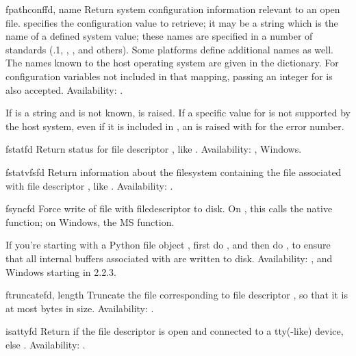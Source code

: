 \begin{funcdesc}{fpathconf}{fd, name}
Return system configuration information relevant to an open file.
 specifies the configuration value to retrieve; it may be a
string which is the name of a defined system value; these names are
specified in a number of standards (\POSIX.1, , , and
others).  Some platforms define additional names as well.  The names
known to the host operating system are given in the
 dictionary.  For configuration variables not
included in that mapping, passing an integer for  is also
accepted.
Availability: \UNIX.

If  is a string and is not known,  is
raised.  If a specific value for  is not supported by the
host system, even if it is included in , an
 is raised with  for the
error number.
\end{funcdesc}

\begin{funcdesc}{fstat}{fd}
Return status for file descriptor , like .
Availability: \UNIX, Windows.
\end{funcdesc}

\begin{funcdesc}{fstatvfs}{fd}
Return information about the filesystem containing the file associated
with file descriptor , like .
Availability: \UNIX.
\end{funcdesc}

\begin{funcdesc}{fsync}{fd}
Force write of file with filedescriptor  to disk.  On \UNIX,
this calls the native  function; on Windows, the
MS  function.

If you're starting with a Python file object , first do
, and then do ,
to ensure that all internal buffers associated with  are written
to disk.
Availability: \UNIX, and Windows starting in 2.2.3.
\end{funcdesc}

\begin{funcdesc}{ftruncate}{fd, length}
Truncate the file corresponding to file descriptor ,
so that it is at most  bytes in size.
Availability: \UNIX.
\end{funcdesc}

\begin{funcdesc}{isatty}{fd}
Return  if the file descriptor  is open and
connected to a tty(-like) device, else .
Availability: \UNIX.
\end{funcdesc}


